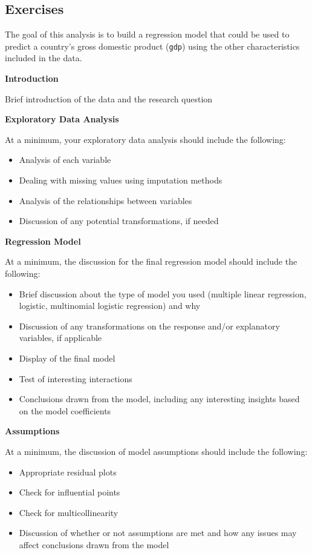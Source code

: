\documentclass[]{book}
\providecommand{\tightlist}{%
  \setlength{\itemsep}{0pt}\setlength{\parskip}{0pt}}
\begin{document}
\subsection{Exercises}\label{exercises-8}

The goal of this analysis is to build a regression model that could be
used to predict a country's gross domestic product (\texttt{gdp}) using
the other characteristics included in the data.

\textbf{Introduction}

Brief introduction of the data and the research question

\textbf{Exploratory Data Analysis}

At a minimum, your exploratory data analysis should include the
following:

\begin{itemize}
\tightlist
\item
  Analysis of each variable
\item
  Dealing with missing values using imputation methods
\item
  Analysis of the relationships between variables
\item
  Discussion of any potential transformations, if needed
\end{itemize}

\textbf{Regression Model}

At a minimum, the discussion for the final regression model should
include the following:

\begin{itemize}
\tightlist
\item
  Brief discussion about the type of model you used (multiple linear
  regression, logistic, multinomial logistic regression) and why
\item
  Discussion of any transformations on the response and/or explanatory
  variables, if applicable
\item
  Display of the final model
\item
  Test of interesting interactions
\item
  Conclusions drawn from the model, including any interesting insights
  based on the model coefficients
\end{itemize}

\textbf{Assumptions}

At a minimum, the discussion of model assumptions should include the
following:

\begin{itemize}
\tightlist
\item
  Appropriate residual plots
\item
  Check for influential points
\item
  Check for multicollinearity
\item
  Discussion of whether or not assumptions are met and how any issues
  may affect conclusions drawn from the model
\end{itemize}
\end{document}

